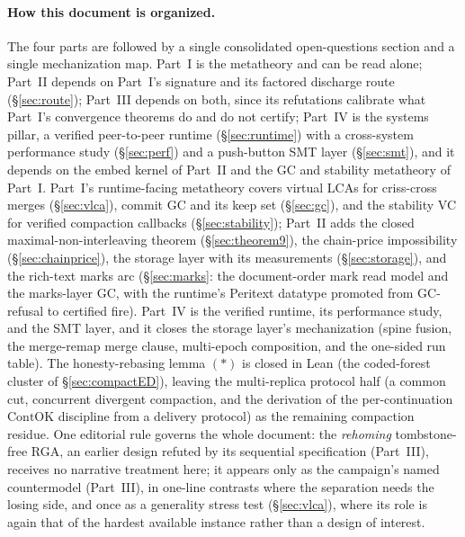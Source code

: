 \documentclass[11pt]{article}
\begin{document}
\ifdefined\salSplitPaper\else
\paragraph*{How this document is organized.} The four parts are
followed by a single consolidated open-questions section and a single
mechanization map. Part~I is the metatheory and can be read alone;
Part~II depends on Part~I's signature and its factored discharge route
(\S\ref{sec:route}); Part~III depends on both, since its refutations
calibrate what Part~I's convergence theorems do and do not certify;
Part~IV is the systems pillar, a verified peer-to-peer runtime
(\S\ref{sec:runtime}) with a cross-system performance study
(\S\ref{sec:perf}) and a push-button SMT layer (\S\ref{sec:smt}), and it
depends on the embed kernel of Part~II and the GC and stability
metatheory of Part~I. Part~I's runtime-facing
metatheory covers virtual LCAs for criss-cross merges (\S\ref{sec:vlca}),
commit GC and its keep set (\S\ref{sec:gc}), and the stability VC for
verified compaction callbacks (\S\ref{sec:stability}); Part~II adds
the closed maximal-non-interleaving theorem (\S\ref{sec:theorem9}), the
chain-price impossibility (\S\ref{sec:chainprice}), the storage
layer with its measurements (\S\ref{sec:storage}), and the rich-text
marks arc (\S\ref{sec:marks}: the document-order mark read model and the
marks-layer GC, with the runtime's Peritext datatype promoted from
GC-refusal to certified fire). Part~IV is the verified runtime, its
performance study, and the SMT layer, and it closes the storage layer's
mechanization (spine fusion, the merge-remap merge clause, multi-epoch
composition, and the one-sided run table). The honesty-rebasing lemma
$(\ast)$ is closed in Lean (the coded-forest cluster of
\S\ref{sec:compactED}), leaving the multi-replica protocol half (a common
cut, concurrent divergent compaction, and the derivation of the
per-continuation $\mathrm{ContOK}$ discipline from a delivery protocol) as
the remaining compaction residue. One editorial rule
governs the whole document: the
\emph{rehoming} tombstone-free RGA, an earlier design refuted by its
sequential specification (Part~III), receives no narrative treatment here; it appears
only as the campaign's named countermodel (Part~III), in one-line
contrasts where the separation needs the losing side, and once as a
generality stress test (\S\ref{sec:vlca}), where its role is again that
of the hardest available instance rather than a design of interest.
\fi

\tableofcontents
\end{document}
